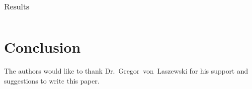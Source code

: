 \begin{table}[hbt]
	\centering \caption{Results}\label{t:results-table} \begin{tabular}{llll} \end{tabular}
\end{table}


\section{Conclusion}



\begin{acks}

  The authors would like to thank Dr.~Gregor~von~Laszewski for his
  support and suggestions to write this paper.

\end{acks}


 

